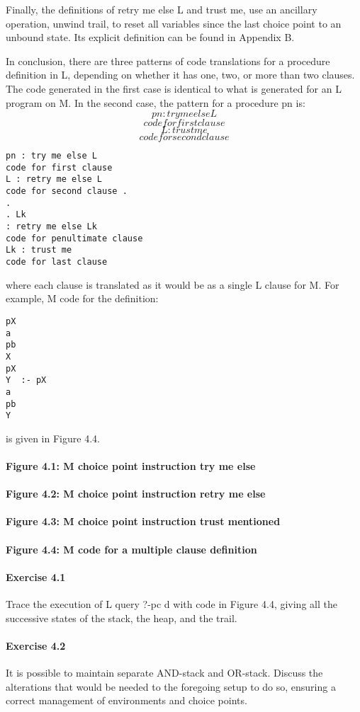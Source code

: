 Finally, the definitions of retry me else L and trust me, use an ancillary
operation, unwind trail, to reset all variables since the last choice point to an unbound
state. Its explicit definition can be found in Appendix B.

In conclusion, there are three patterns of code translations for a procedure definition
in L, depending on whether it has one, two, or more than two clauses. The
code generated in the first case is identical to what is generated for an L program
on M. In the second case, the pattern for a procedure pn is:
\[pn : try me else L\]
\[code for first clause\]
\[L : trust me\]
\[code for second clause\]
\begin{verbatim}
pn : try me else L
code for first clause
L : retry me else L
code for second clause .
.
. Lk
: retry me else Lk
code for penultimate clause
Lk : trust me
code for last clause
\end{verbatim}
where each clause is translated as it would be as a single L clause for M. For
example, M code for the definition:
\begin{verbatim}
pX
a
pb
X
pX
Y  :- pX
a
pb
Y 
\end{verbatim}
is given in Figure 4.4.

\paragraph{Figure 4.1: M choice point instruction try me else}

\paragraph{Figure 4.2: M choice point instruction retry me else}

\paragraph{Figure 4.3: M choice point instruction trust mentioned}

\paragraph{Figure 4.4: M code for a multiple clause definition}

\paragraph{Exercise 4.1} Trace the execution of L query ?-pc d with code in
Figure 4.4, giving all the successive states of the stack, the heap, and the trail.

\paragraph{Exercise 4.2} It is possible to maintain separate AND-stack and
OR-stack.
Discuss the alterations that would be needed to the foregoing setup to do so, ensuring a
correct management of environments and choice points.

